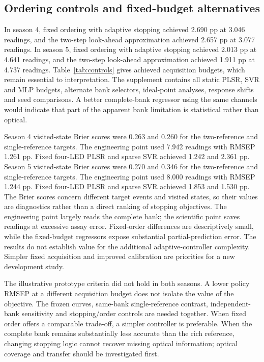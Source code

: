 \documentclass[11pt,a4paper]{article}
\begin{document}
\subsection{Ordering controls and fixed-budget alternatives}
In season 4, fixed ordering with adaptive stopping achieved 2.690 pp at 3.046 readings, and the two-step look-ahead approximation achieved 2.657 pp at 3.077 readings. In season 5, fixed ordering with adaptive stopping achieved 2.013 pp at 4.641 readings, and the two-step look-ahead approximation achieved 1.911 pp at 4.737 readings. Table~\ref{tab:controls} gives achieved acquisition budgets, which remain essential to interpretation. The supplement contains all static PLSR, SVR and MLP budgets, alternate bank selectors, ideal-point analyses, response shifts and seed comparisons. A better complete-bank regressor using the same channels would indicate that part of the apparent bank limitation is statistical rather than optical.
\begin{table}[tb]\centering\small
\caption{Primary-bank controls and selected fixed-budget physical references, seed 42. Fixed-length scans use their development-selected length.}\label{tab:controls}

\end{table}

Season 4 visited-state Brier scores were 0.263 and 0.260 for the two-reference and single-reference targets. The engineering point used 7.942 readings with RMSEP 1.261 pp. Fixed four-LED PLSR and sparse SVR achieved 1.242 and 2.361 pp. Season 5 visited-state Brier scores were 0.270 and 0.346 for the two-reference and single-reference targets. The engineering point used 8.000 readings with RMSEP 1.244 pp. Fixed four-LED PLSR and sparse SVR achieved 1.853 and 1.530 pp.
The Brier scores concern different target events and visited states, so their values are diagnostics rather than a direct ranking of stopping objectives. The engineering point largely reads the complete bank; the scientific point saves readings at excessive assay error. Fixed-order differences are descriptively small, while the fixed-budget regressors expose substantial partial-prediction error. The results do not establish value for the additional adaptive-controller complexity. Simpler fixed acquisition and improved calibration are priorities for a new development study.

The illustrative prototype criteria did not hold in both seasons. A lower policy RMSEP at a different acquisition budget does not isolate the value of the objective. The frozen curves, same-bank single-reference contrast, independent-bank sensitivity and stopping/order controls are needed together. When fixed order offers a comparable trade-off, a simpler controller is preferable. When the complete bank remains substantially less accurate than the rich reference, changing stopping logic cannot recover missing optical information; optical coverage and transfer should be investigated first.
\end{document}
